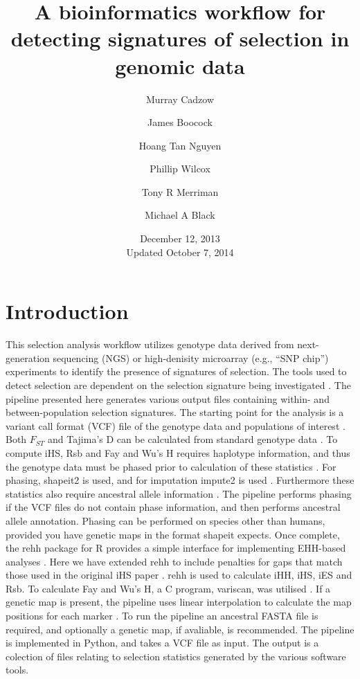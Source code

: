 \documentclass[a4paper,10pt]{article}
\title{\textbf{A bioinformatics workflow for detecting signatures of selection in genomic data}}
\date{December 12, 2013\\ Updated October 7, 2014}
\author[1]{Murray Cadzow}
\author[1]{James Boocock}
\author[1,2]{Hoang Tan Nguyen}
\author[1,3]{Phillip Wilcox}
\author[1]{Tony R Merriman}
\author[1]{Michael A Black}
\affil[1]{Department of Biochemistry, University of Otago}
\affil[2]{Department of Mathematics and Statistics, University of Otago}
\affil[3]{Scion Research, Rotorua, New Zealand}
\begin{document}
\maketitle{}\textmd{}
\tableofcontents

\pagebreak
\section{Introduction}

This selection analysis workflow utilizes genotype data derived from
next-generation sequencing (NGS) or high-denisity microarray (e.g.,
``SNP chip'') experiments to identify the presence of signatures of
selection. The tools used to detect selection are dependent on the
selection signature being investigated \citep{Sabeti:2006ha}. The
pipeline presented here generates various output files containing
within- and between-population selection signatures. The starting
point for the analysis
is a variant call format (VCF) file of the genotype data and
populations of interest \citep{Danecek:2011gz}. Both $F_{ST}$ and
Tajima's D can be calculated from standard genotype data
\citep{Weir:1984vn, Tajima:1989un}. To compute iHS, Rsb and Fay
and Wu's H requires haplotype information, and thus the genotype data must be
phased prior to calculation of these statistics \citep{Voight:2006go,
  Gautier:2012et,fayandwush}. For phasing, shapeit2 is
  used, and for imputation impute2 is used \citep{impute22009,
    Delaneau:2013hi}. Furthermore these statistics also require
    ancestral allele information \citep{Flicek:2012vg}.  The pipeline
    performs phasing if the VCF files do not contain phase information, and
    then performs ancestral allele annotation. Phasing can be performed on species other than humans, provided you have genetic maps in the format shapeit expects. 
    Once complete, the rehh
    package for R provides a simple interface for implementing EHH-based
    analyses \citep{Gautier:2012et}. Here we have extended rehh to include penalties
    for gaps that match those used in the original iHS paper
        \citep{Voight:2006go}. rehh is used to calculate iHH, iHS, iES and Rsb. To
        calculate Fay and Wu's H, a C program, variscan, was utilised
        \citep{variscan2005}. If a genetic map is present, the pipeline uses linear interpolation to calculate the map positions for each
        marker \citep{Nievergelt:2004ci}. To run the pipeline an ancestral FASTA file is required, and optionally a genetic map, if avaliable, is recommended. 
        The pipeline is implemented in Python, and takes a VCF
        file as input. The output is a colection of files relating to selection
        statistics generated by the various software tools.
\end{document}
